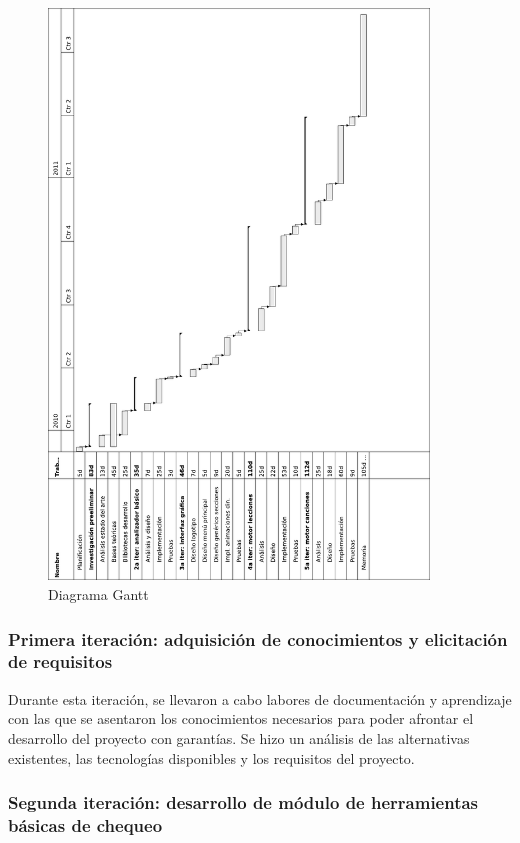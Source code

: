 \documentclass[a4paper,12pt]{article}
\begin{document}
\begin{figure}[htp]
  \centering
  \includegraphics[width=0.9\textwidth]{imagen_diagrama_gantt}
  \caption{Diagrama Gantt}
  \label{fig:gantt}
\end{figure}

\subsubsection{Primera iteración: adquisición de conocimientos y elicitación de requisitos}

Durante esta iteración, se llevaron a cabo labores de documentación y
aprendizaje con las que se asentaron los conocimientos necesarios para poder
afrontar el desarrollo del proyecto con garantías. Se hizo un análisis de las
alternativas existentes, las tecnologías disponibles y los requisitos del
proyecto.

\subsubsection{Segunda iteración: desarrollo de módulo de herramientas básicas de
  chequeo}
\end{document}
